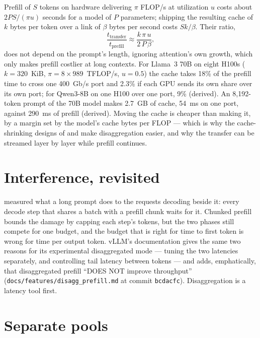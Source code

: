 
Prefill of $S$ tokens on hardware delivering $\pi$ FLOP/s at utilization $u$
costs about $2PS/(\pi u)$ seconds for a model of $P$ parameters; shipping the
resulting cache of $k$ bytes per token over a link of $\beta$ bytes per second
costs $Sk/\beta$. Their ratio,
\begin{equation}
\frac{t_{\text{transfer}}}{t_{\text{prefill}}} \approx \frac{k\,\pi\,u}{2\,P\,\beta},
\label{eq:pd-ratio}
\end{equation}
does not depend on the prompt's length, ignoring attention's own growth, which
only makes prefill costlier at long contexts. For Llama~3 70B on eight H100s
($k = 320$~KiB, $\pi = 8 \times 989$~TFLOP/s, $u = 0.5$) the cache takes 18\% of
the prefill time to cross one 400~Gb/s port and 2.3\% if each GPU sends its own
share over its own port; for Qwen3-8B on one H100 over one port, 9\% (derived).
An 8,192-token prompt of the 70B model makes 2.7~GB of cache, 54~ms on one
port, against 290~ms of prefill (derived). Moving the cache is cheaper than
making it, by a margin set by the model's cache bytes per FLOP --- which is why
the cache-shrinking designs of  and 
make disaggregation easier, and why the transfer can be streamed layer by layer
while prefill continues.

\section{Interference, revisited}

 measured what a long prompt does to the requests
decoding beside it: every decode step that shares a batch with a prefill chunk
waits for it. Chunked prefill bounds the damage by capping each step's tokens,
but the two phases still compete for one budget, and the budget that is right
for time to first token is wrong for time per output token. vLLM's
documentation gives the same two reasons for its experimental disaggregated
mode --- tuning the two latencies separately, and controlling tail latency
between tokens --- and adds, emphatically, that disaggregated prefill ``DOES
NOT improve throughput'' (\texttt{docs/features/disagg\_prefill.md} at commit
\texttt{bcdacfc}). Disaggregation is a latency tool first.

\section{Separate pools}


